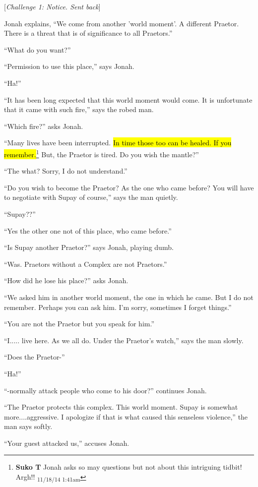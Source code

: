 {[}\textit{Challenge 1: Notice.  Sent back}{]}

Jonah explains, ``We come from another 'world moment'.  A different Praetor.  There is a threat that is of significance to all Praetors.''

``What do you want?''

``Permission to use this place,'' says Jonah.

``Ha!''

``It has been long expected that this world moment would come.  It is unfortunate that it came with such fire,'' says the robed man.

``Which fire?'' asks Jonah.

``Many lives have been interrupted.  \hl{In time those too can be healed.  If you remember.}\footnote{\textbf{Suko T }Jonah asks so may questions but not about this intriguing tidbit! Argh!! \textsubscript{11/18/14 1:41am}} But, the Praetor is tired.  Do you wish the mantle?''

``The what? Sorry, I do not understand.''

``Do you wish to become the Praetor?  As the one who came before?  You will have to negotiate with Supay of course,'' says the man quietly.

``Supay??''

``Yes the other one not of this place, who came before.''

``Is Supay another Praetor?'' says Jonah, playing dumb.

``Was. Praetors without a Complex are not Praetors.''

``How did he lose his place?'' asks Jonah.

``We asked him in another world moment, the one in which he came. But I do not remember.  Perhaps you can ask him.  I'm sorry, sometimes I forget things.''

``You are not the Praetor but you speak for him.''

``I..... live here.  As we all do.  Under the Praetor's watch,'' says the man slowly.

``Does the Praetor-''

``Ha!''

``-normally attack people who come to his door?'' continues Jonah.

``The Praetor protects this complex.  This world moment.  Supay is somewhat more....aggressive.  I apologize if that is what caused this senseless violence,''  the man says softly.

``Your guest attacked us,'' accuses Jonah.

